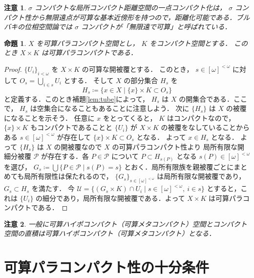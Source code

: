 \documentclass[leqno, 12pt]{ltjsarticle}
\newtheorem{prop}[thm]{命題}
\newtheorem*{rmk}{注意}
\newcommand{\FinSubsets}[1]{[#1]^{<\omega}}
\begin{document}
\begin{rmk}
$\sigma$
コンパクトな局所コンパクト距離空間の一点コンパクト化は，
$\sigma$
コンパクト性から無限遠点が可算な基本近傍形を持つので，距離化可能である．ブルバキの位相空間論では
$\sigma$
コンパクトが「無限遠で可算」と呼ばれている．
\end{rmk}


\begin{prop}\label{prop:cptprod}
$X$
を可算パラコンパクト空間とし，
$K$
をコンパクト空間とする．
このとき
$X\times K$
は可算パラコンパクトである．
\end{prop}
\begin{proof}
$\{U_{i}\}_{i<\omega}$
を
$X\times K$
の可算な開被覆とする．
このとき，
$s\in \FinSubsets{\omega}$
に対して
$O_{s}=\bigcup_{i\in s}U_{i}$
とする．
そして
$X$
の部分集合
$H_{s}$
を
\[
H_{s}\coloneqq\{x\in X \mid \{x\}\times K\subset O_{s}\}
\]
と定義する．このとき補題\ref{lem:tube}によって，
$H_{s}$
は
$X$
の開集合である．ここで，
$H_{s}$
は空集合になることもあることに注意しよう．
次に
$\{H_{s}\}$
は
$X$
の被覆になることを示そう．
任意に
$x$
をとってくると，
$K$
はコンパクトなので，
$\{x\}\times K$
もコンパクトであることと
$\{U_{i}\}$
が
$X\times K$
の被覆をなしていることからある
$s\in \FinSubsets{\omega}$
が存在して
$\{x\}\times K\subset O_{s}$
となる．
よって
$x\in H_{s}$
となる．
よって
$\{H_{s}\}$
は
$X$
の開被覆なので
$X$
の可算パラコンパクト性より
局所有限な開細分被覆
$\mathcal{P}$
が存在する．各
$P\in\mathcal{P}$
について
$P\subset H_{s(P)}$
となる
$s(P)\in\FinSubsets{\omega}$
を選び，
$G_{s}\coloneqq\bigcup\{P\in\mathcal{P} \mid s(P)=s\}$
とおく．局所有限族を親被覆ごとにまとめても局所有限性は保たれるので，
$\{G_{s}\}_{s\in\FinSubsets{\omega}}$
は局所有限な開被覆であり，
$G_{s}\subset H_{s}$
を満たす．
今
$\mathcal{U}=\{(G_{s}\times K)\cap U_{i} \mid s\in\FinSubsets{\omega},\ i\in s\}$
とすると，これは
$\{U_{i}\}$
の細分であり，局所有限な開被覆である．よって
$X\times K$
は可算パラコンパクトである．
\end{proof}

\begin{rmk}
一般に可算ハイポコンパクト（可算メタコンパクト）空間とコンパクト空間の直積は可算ハイポコンパクト（可算メタコンパクト）となる．
\end{rmk}

\section{可算パラコンパクト性の十分条件}
\end{document}
